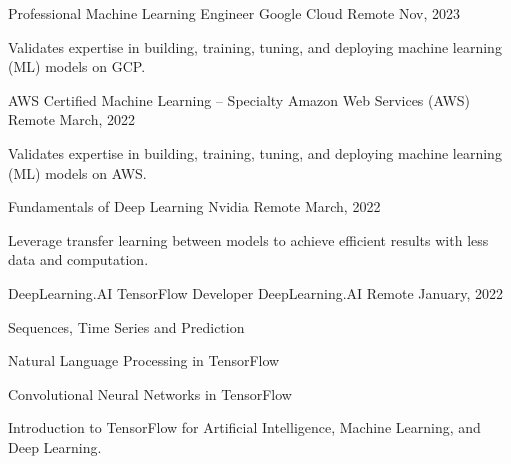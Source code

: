

\begin{cventries}
  \cventry
  {Professional Machine Learning Engineer} %
  {Google Cloud} %
  {Remote} %
  {Nov, 2023} %
  {
    \begin{cvitems} %
      \item {Validates expertise in building, training, tuning, and deploying machine learning (ML) models on GCP.}
    \end{cvitems}
  } %
  \newline
  \cventry
  {AWS Certified Machine Learning – Specialty} %
  {Amazon Web Services (AWS)} %
  {Remote} %
  {March, 2022} %
  {
    \begin{cvitems} %
      \item {Validates expertise in building, training, tuning, and deploying machine learning (ML) models on AWS.}
    \end{cvitems}
  } %
  \newline
  \cventry
  {Fundamentals of Deep Learning} %
  {Nvidia} %
  {Remote} %
  {March, 2022} %
  {
    \begin{cvitems} %
      \item {Leverage transfer learning between models to achieve efficient results with less data and computation.}
    \end{cvitems}
  } %
  \newline
  \cventry
  {DeepLearning.AI TensorFlow Developer} %
  {DeepLearning.AI} %
  {Remote} %
  {January, 2022} %
  {
    \begin{cvitems} %
      \item {Sequences, Time Series and Prediction}
      \item {Natural Language Processing in TensorFlow}
      \item {Convolutional Neural Networks in TensorFlow}
      \item {Introduction to TensorFlow for Artificial Intelligence, Machine Learning, and Deep Learning.}
    \end{cvitems}
  }
\end{cventries}